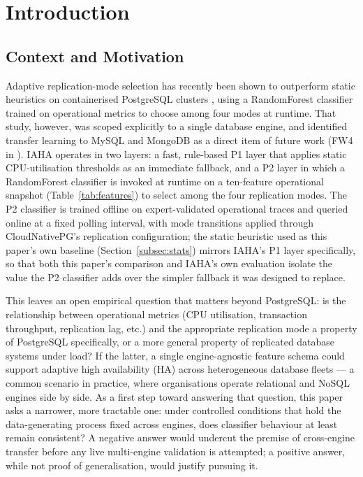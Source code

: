 \documentclass[iicol,pdflatex,sn-mathphys-num]{sn-jnl}
\theoremstyle{thmstyleone}
\theoremstyle{thmstylethree}
\begin{document}

\maketitle

\section{Introduction}\label{sec:intro}

\subsection{Context and Motivation}\label{subsec:context}

Adaptive replication-mode selection has recently been shown to
outperform static heuristics on containerised PostgreSQL clusters
\cite{iaha2026}, using a RandomForest classifier trained on operational
metrics to choose among four modes at runtime. That study, however,
was scoped explicitly to a single database engine, and identified
transfer learning to MySQL and MongoDB as a direct item of future
work (FW4 in \cite{iaha2026}). IAHA operates in two layers: a fast,
rule-based P1 layer that applies static CPU-utilisation thresholds as
an immediate fallback, and a P2 layer in which a RandomForest
classifier is invoked at runtime on a ten-feature operational
snapshot (Table~\ref{tab:features}) to select among the four
replication modes. The P2 classifier is trained offline on
expert-validated operational traces and queried online at a fixed
polling interval, with mode transitions applied through
CloudNativePG's replication configuration; the static heuristic used
as this paper's own baseline (Section~\ref{subsec:stats}) mirrors
IAHA's P1 layer specifically, so that both this paper's comparison
and IAHA's own evaluation isolate the value the P2 classifier adds
over the simpler fallback it was designed to replace.

This leaves an open empirical question that matters beyond PostgreSQL:
is the relationship between operational metrics (CPU utilisation,
transaction throughput, replication lag, etc.) and the appropriate
replication mode a property of PostgreSQL specifically, or a more
general property of replicated database systems under load? If the
latter, a single engine-agnostic feature schema could support adaptive
high availability (HA) across heterogeneous database fleets --- a
common scenario in practice, where organisations operate relational
and NoSQL engines side by side. As a first step toward answering that
question, this paper asks a narrower, more tractable one: under
controlled conditions that hold the data-generating process fixed
across engines, does classifier behaviour at least remain consistent?
A negative answer would undercut the premise of cross-engine transfer
before any live multi-engine validation is attempted; a positive
answer, while not proof of generalisation, would justify pursuing it.
\end{document}
